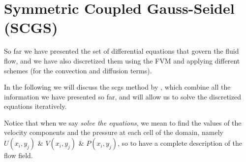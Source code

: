 \section{Symmetric Coupled Gauss-Seidel (SCGS)}
\label{sec:scgs}

So far we have presented the set of differential equations that govern the fluid flow, and we have also discretized them using the FVM and applying different schemes (for the convection and diffusion terms).

In the following we will discuss the \acrfull{scgs} method by \cite[Vanka (1986)]{VANKA1986138}, which combine all the information we have presented so far, and will allow us to solve the discretized equations iteratively.

Notice that when we say \textit{solve the equations}, we mean to find the values of the velocity components and the pressure at each cell of the domain, namely $U(x_i, y_j)$ \& $V(x_i, y_j)$ \& $P(x_i, y_j)$, so to have a complete description of the flow field.









